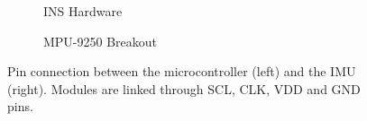 \begin{figure}[!h]
    \centering
    \begin{subfigure}{0.49\textwidth}
        \centering
        \resizebox{1\linewidth}{!}{}
        \caption{INS Hardware}
        \label{fig:triangle16_2D}
    \end{subfigure}
    \begin{subfigure}{0.49\textwidth}
        \centering
        \resizebox{1\linewidth}{!}{}
        \caption{MPU-9250 Breakout}
        \label{fig:triangle16_3D}
    \end{subfigure}
    \caption{Pin connection between the microcontroller (left) and the IMU (right). Modules are linked through SCL, CLK, VDD and GND pins.}
    \label{fig:triangle16}
\end{figure}



%     


